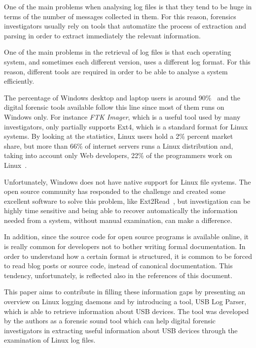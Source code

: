 \documentclass[a4paper,twocolumn]{article}
\begin{document}
One of the main problems when analysing log files is that they tend to be huge
in terms of the number of messages collected in them. For this reason, forensics
investigators usually rely on tools that automatize the process of extraction
and parsing in order to extract immediately the relevant information.

One of the main problems in the retrieval of log files is that each operating
system, and sometimes each different version, uses a different log format. For
this reason, different tools are required in order to be able to analyse a
system efficiently.

The percentage of Windows desktop and laptop users is around 90\%~\cite{usagePC}
and the digital forensic tools available follow this line since most of them
runs on Windows only. For instance \emph{FTK Imager}, which is a useful tool
used by many investigators, only partially supports Ext4, which is a standard
format for Linux systems. By looking at the statistics, Linux users hold a 2\%
percent market share, but more than 66\% of internet servers runs a Linux
distribution and, taking into account only Web developers, 22\% of the
programmers work on Linux~\cite{usagePC}.

Unfortunately, Windows does not have native support for Linux file systems. The
open source community has responded to the challenge and created some excellent
software to solve this problem, like Ext2Read~\cite{ext2read}, but investigation
can be highly time sensitive and being able to recover automatically the
information needed from a system, without manual examination, can make a
difference.

In addition, since the source code for open source programs is available online,
it is really common for developers not to bother writing formal documentation.
In order to understand how a certain format is structured, it is common to be
forced to read blog posts or source code, instead of canonical documentation.
This tendency, unfortunately, is reflected also in the references of this
document.

This paper aims to contribute in filling these information gaps by presenting an
overview on Linux logging daemons and by introducing a tool, USB Log Parser,
which is able to retrieve information about USB devices. The tool was developed
by the authors as a forensic sound tool which can help digital forensic
investigators in extracting useful information about USB devices through the
examination of Linux log files.
\end{document}
